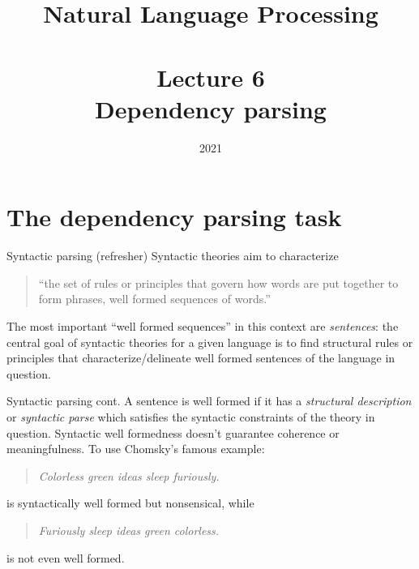 \documentclass[style=upen, size=14pt]{powerdot}
\theoremstyle{definition}
\begin{document}
\title{Natural Language Processing\\~~\\Lecture 6\\Dependency parsing}

\date{2021}
\maketitle

\section{The dependency parsing task}

\begin{slide}[toc=Syntactic parsing]{Syntactic parsing (refresher)}
  Syntactic theories aim to characterize

  \begin{quote}
  ``the set of rules or principles that
  govern how words are put together to form phrases, well formed sequences of
  words.'' \citep[1]{koopman2013introduction}
\end{quote}

  The most important ``well formed sequences'' in this context are
  \emph{sentences}: the central goal of syntactic theories for a given language
  is to find structural rules or principles that characterize/delineate well
  formed sentences of the language in question.
\end{slide}

\begin{slide}[toc=]{Syntactic parsing cont.}
  A sentence is well formed if it has a \emph{structural description} or
  \emph{syntactic parse} which satisfies the syntactic constraints of the theory in
  question. Syntactic well formedness doesn't guarantee coherence or
  meaningfulness. To use Chomsky's famous example:
  
  \begin{quotation}
    \emph{Colorless green ideas sleep furiously.}
  \end{quotation}
  
  is syntactically well formed but nonsensical, while

  \begin{quotation}
    \emph{Furiously sleep ideas green colorless.}
  \end{quotation}

  is not even well formed.
\end{slide}
\end{document}
